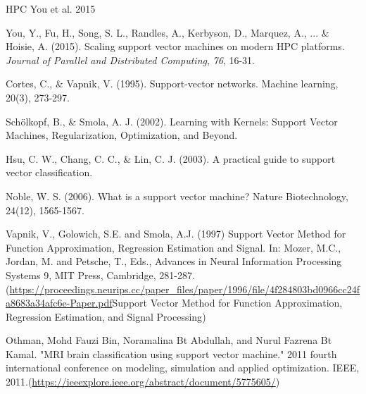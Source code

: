 HPC You et al. 2015



You, Y., Fu, H., Song, S. L., Randles, A., Kerbyson, D., Marquez, A.,
... \& Hoisie, A. (2015). Scaling support vector machines on modern HPC
platforms. \emph{Journal of Parallel and Distributed Computing},
\emph{76}, 16-31.





Cortes, C., \& Vapnik, V. (1995). Support-vector networks. Machine
learning, 20(3), 273-297.

Schölkopf, B., \& Smola, A. J. (2002). Learning with Kernels:
Support Vector Machines, Regularization, Optimization, and Beyond.

Hsu, C. W., Chang, C. C., \& Lin, C. J. (2003). A practical guide to
support vector classification.

Noble, W. S. (2006). What is a support vector machine? Nature
Biotechnology, 24(12), 1565-1567.

Vapnik, V., Golowich, S.E. and Smola, A.J. (1997) Support Vector
Method for Function Approximation, Regression Estimation and Signal. In:
Mozer, M.C., Jordan, M. and Petsche, T., Eds., Advances in Neural
Information Processing Systems 9, MIT Press, Cambridge, 281-287.
(\url{https://proceedings.neurips.cc/paper_files/paper/1996/file/4f284803bd0966cc24fa8683a34afc6e-Paper.pdf}{Support
Vector Method for Function Approximation, Regression Estimation, and
Signal Processing})

Othman, Mohd Fauzi Bin, Noramalina Bt Abdullah, and Nurul Fazrena Bt
Kamal. "MRI brain classification using support vector machine." 2011
fourth international conference on modeling, simulation and applied
optimization. IEEE,
2011.(\url{https://ieeexplore.ieee.org/abstract/document/5775605/})

